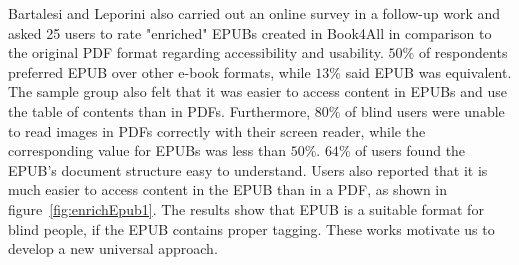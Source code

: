 Bartalesi and Leporini \cite{enrichEPUB} also carried out an online survey in a follow-up work and asked 25 users to rate "enriched" EPUBs created in Book4All in comparison to the original PDF format regarding accessibility and usability. $50\%$ of respondents preferred EPUB over other e-book formats, while $13\%$ said EPUB was equivalent.
The sample group also felt that it was easier to access content in EPUBs and use the table of contents than in PDFs.
Furthermore, $80\%$ of blind users were unable to read images in PDFs correctly with their screen reader, while the corresponding value for EPUBs was less than $50\%$. $64\%$ of users found the EPUB's document structure easy to understand. Users also reported that it is much easier to access content in the EPUB than in a PDF, as shown in figure~\ref{fig:enrichEpub1}.  The results show that EPUB is a suitable format for blind people, if the EPUB contains proper tagging. 
These works motivate us to develop a new universal approach.

